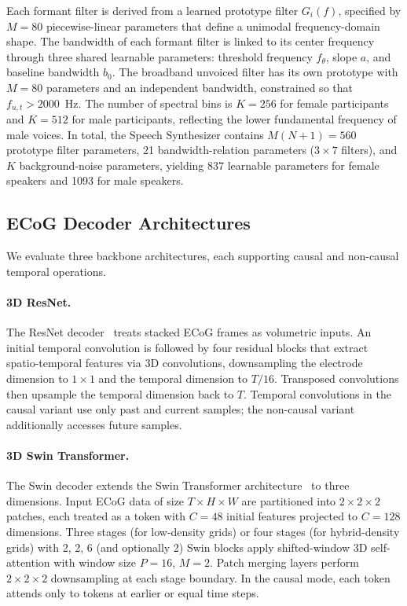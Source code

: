 \documentclass[10pt]{article}
\begin{document}
Each formant filter is derived from a learned prototype filter $G_i(f)$, specified by $M=80$ piecewise-linear parameters that define a unimodal frequency-domain shape. The bandwidth of each formant filter is linked to its center frequency through three shared learnable parameters: threshold frequency $f_\theta$, slope $a$, and baseline bandwidth $b_0$. The broadband unvoiced filter has its own prototype with $M=80$ parameters and an independent bandwidth, constrained so that $f_{u,t}>2000$~Hz. The number of spectral bins is $K=256$ for female participants and $K=512$ for male participants, reflecting the lower fundamental frequency of male voices. In total, the Speech Synthesizer contains $M(N+1)=560$ prototype filter parameters, 21 bandwidth-relation parameters ($3 \times 7$ filters), and $K$ background-noise parameters, yielding 837 learnable parameters for female speakers and 1093 for male speakers.

\subsection{ECoG Decoder Architectures}

We evaluate three backbone architectures, each supporting causal and non-causal temporal operations.

\paragraph{3D ResNet.}
The ResNet decoder~\cite{he2016deep} treats stacked ECoG frames as volumetric inputs. An initial temporal convolution is followed by four residual blocks that extract spatio-temporal features via 3D convolutions, downsampling the electrode dimension to $1\times1$ and the temporal dimension to $T/16$. Transposed convolutions then upsample the temporal dimension back to $T$. Temporal convolutions in the causal variant use only past and current samples; the non-causal variant additionally accesses future samples.

\paragraph{3D Swin Transformer.}
The Swin decoder extends the Swin Transformer architecture~\cite{liu2021swin,liu2022video} to three dimensions. Input ECoG data of size $T\times H\times W$ are partitioned into $2\times2\times2$ patches, each treated as a token with $C=48$ initial features projected to $C=128$ dimensions. Three stages (for low-density grids) or four stages (for hybrid-density grids) with 2, 2, 6 (and optionally 2) Swin blocks apply shifted-window 3D self-attention with window size $P=16$, $M=2$. Patch merging layers perform $2\times2\times2$ downsampling at each stage boundary. In the causal mode, each token attends only to tokens at earlier or equal time steps.
\end{document}
